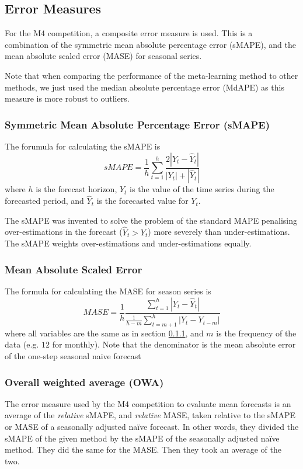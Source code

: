 \documentclass[a4paper,12pt]{article}
\theoremstyle{definition}
\begin{document}
\subsection{Error Measures}
For the M4 competition, a composite error measure is used. This is a combination of the symmetric mean absolute percentage error (sMAPE), and the mean absolute scaled error (MASE) for seasonal series.

Note that when comparing the performance of the meta-learning method to other methods, we just used the median absolute percentage error (MdAPE) as this measure is more robust to outliers.

\subsubsection{Symmetric Mean Absolute Percentage Error (sMAPE)}\label{sec:smape}
The forumula for calculating the sMAPE is
\begin{equation}
	sMAPE = \frac{1}{h}\sum_{t=1}^{h}\frac{2 |Y_t - \hat{Y}_t|}{|Y_t| + |\hat{Y}_t|}
\end{equation}
where $h$ is the forecast horizon, $Y_t$ is the value of the time series during the forecasted period, and $\hat{Y}_t$ is the forecasted value for $Y_t$. 

The sMAPE was invented to solve the problem of the standard MAPE penalising over-estimations in the forecast ($\hat{Y}_t > Y_t$) more severely than under-estimations. The sMAPE weights over-estimations and under-estimations equally.

\subsubsection{Mean Absolute Scaled Error}
The formula for calculating the MASE for season series is
\begin{equation}
	MASE = \frac{1}{h} \frac{\sum_{t=1}^{h}|Y_t - \hat{Y}_t|}{\frac{1}{h-m}\sum_{t=m+1}^{h}|Y_t - Y_{t-m}|}
\end{equation}
where all variables are the same as in section \ref{sec:smape}, and $m$ is the frequency of the data (e.g. $12$ for monthly). Note that the denominator is the mean absolute error of the one-step seasonal naive forecast

\subsubsection{Overall weighted average (OWA)}
The error measure used by the M4 competition to evaluate mean forecasts is an average of the \textit{relative} sMAPE, and \textit{relative} MASE, taken relative to the sMAPE or MASE of a seasonally adjusted na{\"i}ve forecast. In other words, they divided the sMAPE of the given method by the sMAPE of the seasonally adjusted na{\"i}ve method. They did the same for the MASE. Then they took an average of the two.
\end{document}

